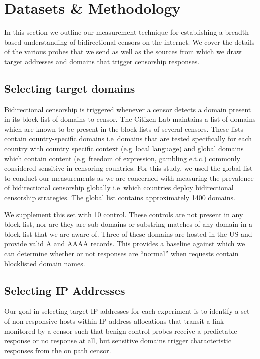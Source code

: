\section{Datasets \& Methodology}\label{sec:methodology}

In this section we outline our measurement technique for establishing a breadth
based understanding of bidirectional censors on the internet. We cover the
details of the various probes that we send as well as the sources from which we
draw target addresses and domains that trigger censorship responses.

\FigProbeSend

\subsection{Selecting target domains}
\label{sec:methodology:domains}
Bidirectional censorship is triggered whenever a censor detects a domain present
in its block-list of domains to censor. The Citizen Lab \cite{TheCitiz6:online}
maintains a list of domains \cite{testlist} which are known to be present in the
block-lists of several censors. These lists contain country-specific domains
i.e\ domains that are tested specifically for each country with country specific
context (e.g\ local language) and global domains which contain content (e.g\
freedom of expression, gambling e.t.c.) commonly considered sensitive in
censoring countries. For this study, we used the global list to conduct our
measurements as we are concerned with measuring the prevalence of bidirectional
censorship globally i.e\ which countries deploy bidirectional censorship
strategies. The global list contains approximately 1400 domains.

We supplement this set with 10 control. These controls are not present
in any block-list, nor are they are sub-domains or substring matches of any
domain in a block-list that we are aware of. Three of these domains are
hosted in the US and provide valid A and AAAA records. This provides a baseline
against which we can determine whether or not responses are ``normal'' when
requests contain blocklisted domain names.

\subsection{Selecting IP Addresses}
\label{subsec:selecting-ips}

\FigAllocSize

Our goal in selecting target IP addresses for each experiment is to identify a
set of non-responsive hosts within IP address allocations that transit a link
monitored by a censor such that benign control probes receive a predictable
response or no response at all, but sensitive domains trigger characteristic
responses from the on path censor.

